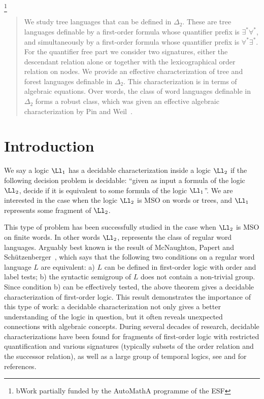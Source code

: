 \documentclass{LMCS}
\begin{document}
\author[L.~Segoufin]{Luc Segoufin\rsuper b}	\address{{\lsuper b}INRIA - LSV}
\thanks{{\lsuper b}Work partially funded by the AutoMathA
programme of the ESF}	

\begin{abstract}
  We study tree languages that can be defined in $\Delta_2$. These are tree
  languages definable by a first-order formula whose quantifier prefix is
  $\exists^*\forall^*$, and simultaneously by a first-order formula whose
  quantifier prefix is $\forall^*\exists^*$. For the quantifier free part we
  consider two signatures, either the descendant relation alone or together
  with the lexicographical order relation on nodes. We provide an effective
  characterization of tree and forest languages
  definable in $\Delta_2$. This characterization is in terms of algebraic
  equations. Over words, the class of word languages definable in $\Delta_2$
  forms a robust class, which was given an effective algebraic characterization
  by Pin and Weil~\cite{weilpinpoly}.
\end{abstract}

\maketitle

\section{Introduction}

We say a logic $\Ll_1$ has a decidable characterization inside a logic $\Ll_2$ if the following
decision problem is decidable: ``given as input a formula of the logic $\Ll_2$,
decide if it is equivalent to some formula of the logic $\Ll_1$''. We are interested in the case when the logic $\Ll_2$ is MSO on words or trees, and $\Ll_1$ represents some fragment of $\Ll_2$. 

This type of problem has been successfully studied in the case when $\Ll_2$ is
MSO on finite words. In other words $\Ll_2$, represents the class of regular
word languages.  Arguably best known is the result of McNaughton, Papert and
Sch\"utzenberger~\cite{schutzenberger,mcnaughton}, which says that the
following two conditions on a regular word language $L$ are equivalent: a) $L$
can be defined in first-order logic with order and label tests; b) the
syntactic semigroup of $L$ does not contain a non-trivial group. Since
condition b) can be effectively tested, the above theorem gives a decidable
characterization of first-order logic. This result demonstrates the importance
of this type of work: a decidable characterization not only gives a better
understanding of the logic in question, but it often reveals unexpected
connections with algebraic concepts.  During several decades of research,
decidable characterizations have been found for fragments of first-order logic
with restricted quantification and various signatures (typically subsets of the
order relation and the successor relation), as well as a large group of
temporal logics, see \cite{pin-survey} and \cite{wilke} for references.
\end{document}
